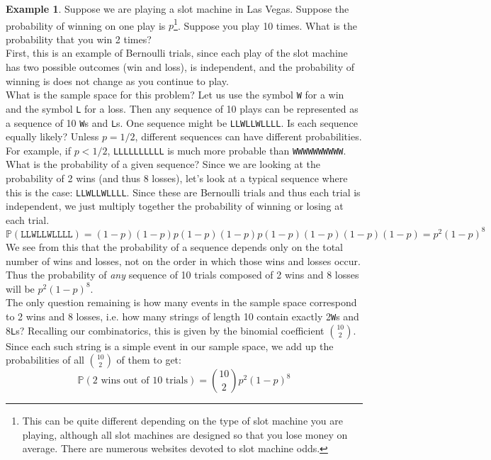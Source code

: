 \documentclass[12pt]{article}
\theoremstyle{definition}
\newtheorem*{example}{Example}
\theoremstyle{remark}
\def\P{{\mathbb P}}
\begin{document}
\begin{example}Suppose we are playing a slot machine in Las Vegas. Suppose the probability of winning on one play is $p$\footnote{This can be quite different depending on the type of slot machine you are playing, although all slot machines are designed so that you lose money on average. There are numerous websites devoted to slot machine odds.}. Suppose you play 10 times. What is the probability that you win 2 times?\\

First, this is an example of Bernoulli trials, since each play of the slot machine has two possible outcomes (win and loss), is independent, and the probability of winning is does not change as you continue to play. \\

What is the sample space for this problem? Let us use the symbol \texttt{W} for a win and the symbol \texttt{L} for a loss. Then any sequence of 10 plays can be represented as a sequence of 10 \texttt{W}s and \texttt{L}s. One sequence might be \texttt{LLWLLWLLLL}. Is each sequence equally likely? Unless $p = 1/2$, different sequences can have different probabilities. For example, if $p < 1/2$, \texttt{LLLLLLLLLL} is much more probable than \texttt{WWWWWWWWWW}. What is the probability of a given sequence? Since we are looking at the probability of 2 wins (and thus 8 losses), let's look at a typical sequence where this is the case: \texttt{LLWLLWLLLL}. Since these are Bernoulli trials and thus each trial is independent, we just multiply together the probability of winning or losing at each trial.
\[
\P(\texttt{LLWLLWLLLL}) = (1-p)(1-p)p(1-p)(1-p)p(1-p)(1-p)(1-p)(1-p) = p^2(1-p)^8
\]
We see from this that the probability of a sequence depends only on the total number of wins and losses, not on the order in which those wins and losses occur. Thus the probability of \emph{any} sequence of 10 trials composed of 2 wins and 8 losses will be $p^2(1-p)^8$.\\

The only question remaining is how many events in the sample space correspond to 2 wins and 8 losses, i.e. how many strings of length 10 contain exactly 2\texttt{W}s and 8\texttt{L}s? Recalling our combinatorics, this is given by the binomial coefficient $\binom{10}{2}$. Since each such string is a simple event in our sample space, we add up the probabilities of all $\binom{10}{2}$ of them to get:
\[
\P(\text{2 wins out of 10 trials})= \binom{10}{2} p^2 (1-p)^8
\]  
\end{example}
\end{document}
